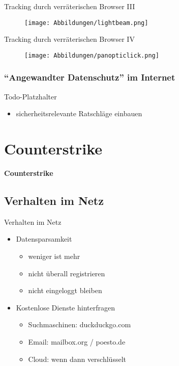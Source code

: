 \documentclass[hyperref={colorlinks,linkcolor=blue}, utf8]{beamer}
\begin{document}
	\begin{frame}{Tracking durch verräterischen Browser III}
		\begin{figure}[V]
			\texttt{[image: Abbildungen/lightbeam.png]}
			\label{fig:lightbeam}
		\end{figure}
	\end{frame}
	
	\begin{frame}{Tracking durch verräterischen Browser IV}
		\begin{figure}[V]
			\texttt{[image: Abbildungen/panopticlick.png]}
			\label{fig:panopticlick}
		\end{figure}
	\end{frame}
	
	\subsubsection{\enquote{Angewandter Datenschutz} im Internet}
	
	\begin{frame}{Todo-Platzhalter}
		\begin{itemize}
			\item sicherheitsrelevante Ratschläge einbauen
			
		\end{itemize}
	\end{frame}
	
	\section{Counterstrike}
	\begin{frame}
		\centering \huge \textbf{Counterstrike}
	\end{frame}
	\subsection{Verhalten im Netz}
	\begin{frame}{Verhalten im Netz}
		\begin{itemize}
			\item Datensparsamkeit
			\begin{itemize}
				\item weniger ist mehr
				\item nicht überall registrieren
				\item nicht eingeloggt bleiben
			\end{itemize}
			\item Kostenlose Dienste hinterfragen
			\begin{itemize}
				\item Suchmaschinen: duckduckgo.com
				\item Email: mailbox.org / poesto.de
				\item Cloud: wenn dann verschlüsselt
			\end{itemize}
		\end{itemize}
	\end{frame}
	
\end{document}
